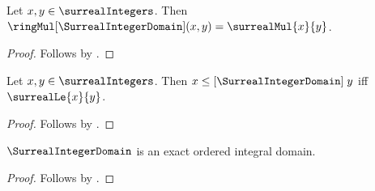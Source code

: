 \begin{proposition}\label{surreal_integer_domain_multiplication}
    Let $x,y\in\surrealIntegers$.
    Then
        $\ringMul[\SurrealIntegerDomain](x,y)=\surrealMul{x}{y}$.
\end{proposition}
\begin{proof}
    Follows by
    .
\end{proof}

\begin{proposition}\label{surreal_integer_domain_order}
    Let $x,y\in\surrealIntegers$.
    Then
        $x\mathrel{\leq[\SurrealIntegerDomain]}y$ iff
        $\surrealLe{x}{y}$.
\end{proposition}
\begin{proof}
    Follows by
    .
\end{proof}

\begin{proposition}\label{surreal_integer_domain_is_exact}
    $\SurrealIntegerDomain$ is an exact ordered integral domain.
\end{proposition}
\begin{proof}
    Follows by
    .
\end{proof}

